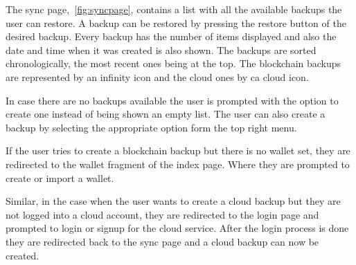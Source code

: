 \documentclass[a4paper,12pt]{report}
\begin{document}
The sync page,~\autoref{fig:syncpage}, contains a list with all the available
backups the user can restore. A backup can be restored by pressing the restore
button of the desired backup. Every backup has the number of items displayed
and also the date and time when it was created is also shown. The backups are
sorted chronologically, the most recent ones being at the top. The blockchain
backups are represented by an infinity icon and the cloud ones by ca cloud
icon.

In case there are no backups available the user is prompted with the option to
create one instead of being shown an empty list. The user can also create a
backup by selecting the appropriate option form the top right menu.

If the user tries to create a blockchain backup but there is no wallet set,
they are redirected to the wallet fragment of the index page. Where they are
prompted to create or import a wallet.

Similar, in the case when the user wants to create a cloud backup but they are
not logged into a cloud account, they are redirected to the login page and
prompted to login or signup for the cloud service. After the login process is
done they are redirected back to the sync page and a cloud backup can now be
created.
\end{document}
